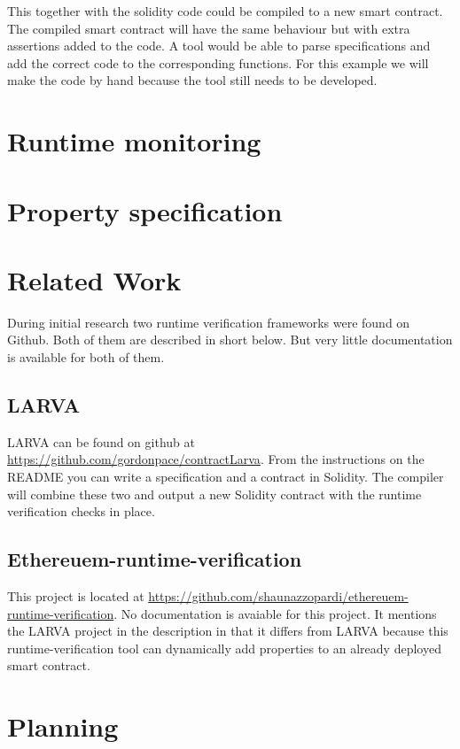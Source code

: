 \documentclass[a4paper]{article}
\begin{document}

 
This together with the solidity code could be compiled to a new smart contract. The compiled smart contract will have the same behaviour but with extra assertions added to the code. A tool would be able to parse specifications and add the correct code to the corresponding functions. For this example we will make the code by hand because the tool still needs to be developed.



\section{Runtime monitoring} 


\section{Property specification}


\section{Related Work}
During initial research two runtime verification frameworks were found on Github. Both of them are described in short below. But very little documentation is available for both of them.
\subsection{LARVA}
LARVA can be found on github at \url{https://github.com/gordonpace/contractLarva}. From the instructions on the README you can write a specification and a contract in Solidity. The compiler will combine these two and output a new Solidity contract with the runtime verification checks in place. 

\subsection{Ethereuem-runtime-verification}
This project is located at \url{https://github.com/shaunazzopardi/ethereuem-runtime-verification}. No documentation is avaiable for this project. It mentions the LARVA project in the description in that it differs from LARVA because this runtime-verification tool can dynamically add properties to an already deployed smart contract.



\section{Planning}
\end{document}
